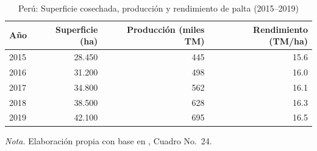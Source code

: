 \begin{table}[H]
\centering
\caption{Per\'u: Superficie cosechada, producci\'on y rendimiento de palta (2015--2019)}
\label{tab:superficie_rendimiento}
\small
\begin{tabular}{lrrr}
\toprule
\textbf{A\~no} & \textbf{Superficie (ha)} & \textbf{Producci\'on (miles TM)} & \textbf{Rendimiento (TM/ha)} \\
\midrule
2015 & 28.450 & 445 & 15.6 \\
2016 & 31.200 & 498 & 16.0 \\
2017 & 34.800 & 562 & 16.1 \\
2018 & 38.500 & 628 & 16.3 \\
2019 & 42.100 & 695 & 16.5 \\
\bottomrule
\end{tabular}
\parbox{0.94\textwidth}{\small \textit{Nota.} Elaboraci\'on propia con base en \citep{SierraSelva2020}, Cuadro No.~24.}
\end{table}
